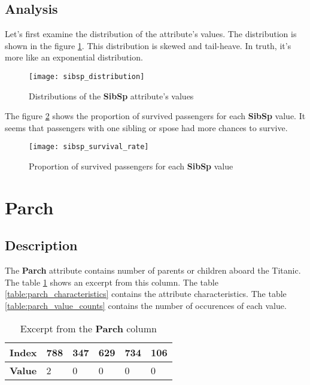 \subsection{Analysis}
Let's first examine the distribution of the attribute's values. The
distribution is shown in the figure \ref{pic:sibsp_distribution}. This
distribution is skewed and tail-heave. In truth, it's more like an 
exponential distribution.

\begin{figure}[!ht]
    \centering
    \texttt{[image: sibsp\_distribution]}
    \caption{Distributions of the \textbf{SibSp} attribute's values}
    \label{pic:sibsp_distribution}
\end{figure}

The figure \ref{pic:sibsp_survival_rate} shows the proportion of survived
passengers for each \textbf{SibSp} value. It seems that passengers with
one sibling or spose had more chances to survive.

\begin{figure}[!ht]
    \centering
    \texttt{[image: sibsp\_survival\_rate]}
    \caption{Proportion of survived passengers for each \textbf{SibSp}
             value}
    \label{pic:sibsp_survival_rate}
\end{figure}


\section{Parch} \label{section:Parch}
\subsection{Description}
The \textbf{Parch} attribute contains number of parents or children 
aboard the Titanic. The table \ref{table:parch_head} shows an excerpt from
this column. The table \ref{table:parch_characteristics} contains the
attribute characteristics. The table \ref{table:parch_value_counts} contains
the number of occurences of each value.

\begin{table}[!ht]
    \centering
    \caption{Excerpt from the \textbf{Parch} column}
    \begin{tabular}{|l|l|l|l|l|l|}
        \hline
        \textbf{Index} & 788 & 347 & 629 & 734 & 106 \\ \hline
        \textbf{Value} & 2   & 0   & 0   & 0   & 0   \\ \hline
    \end{tabular}
    \label{table:parch_head}
\end{table}

